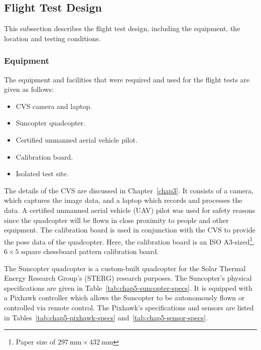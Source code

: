 \subsection{Flight Test Design}

This subsection describes the flight test design, including the equipment, the location and testing conditions.

\subsubsection{Equipment}

The equipment and facilities that were required and used for the flight tests are given as follows:

\begin{itemize}
    \item CVS camera and laptop.
    \item Suncopter quadcopter.
    \item Certified unmanned aerial vehicle pilot.
    \item Calibration board.
    \item Isolated test site. 
\end{itemize}

The details of the CVS are discussed in Chapter~\ref{chap3}. It consists of a camera, which captures the image data, and a laptop which records and processes the data. A certified unmanned aerial vehicle (UAV) pilot was used for safety reasons since the quadcopter will be flown in close proximity to people and other equipment. The calibration board is used in conjunction with the CVS to provide the pose data of the quadcopter. Here, the calibration board is an ISO A3-sized\footnote{Paper size of $\SI{297}{\mm}\times\SI{432}{\mm}$}, $6\times5$ square chessboard pattern calibration board. 

The Suncopter quadcopter is a custom-built quadcopter for the Solar Thermal Energy Research Group's (STERG) research purposes. The Suncopter's physical specifications are given in Table~\ref{tab:chap5-suncopter-specs}. It is equipped with a Pixhawk controller which allows the Suncopter to be autonomously flown or controlled via remote control. The Pixhawk's specifications and sensors are listed in Tables~\ref{tab:chap5-pixhawk-specs} and~\ref{tab:chap5-sensor-specs}.

